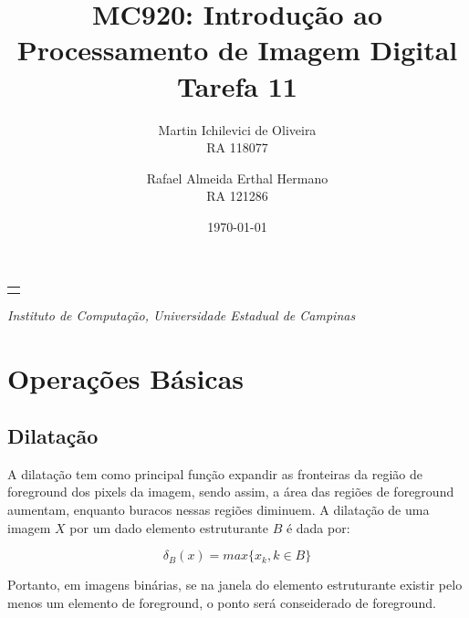 \documentclass[10pt,a4paper]{article}
\makeatletter
\let\@institution\empty
\def\institution#1{\def\@institution{#1}}
\renewcommand{\maketitle}{
    \begin{center}
        {\Large\bfseries\@title\par\medskip}
        {\large
            \begin{tabular}[t]{c}%
                \@author
        \end{tabular}\par\medskip}
        {\itshape\@institution\par}
        {\itshape\@date\par}
\end{center}}
\makeatother
\begin{document}

\title{MC920: Introdução ao Processamento de Imagem Digital\\Tarefa 11}
\author{
    \begin{minipage}{6cm}
        \centering
        Martin Ichilevici de Oliveira\\
        RA 118077
    \end{minipage}
    \and
    \begin{minipage}{6cm}
        \centering
        Rafael Almeida Erthal Hermano\\
        RA 121286
    \end{minipage}
}
\institution{Instituto de Computação, Universidade Estadual de Campinas}
\date{\today}

\maketitle

\section{Operações Básicas}

\subsection{Dilatação}
A dilatação tem como principal função expandir as fronteiras da região de foreground dos pixels da imagem, sendo assim, a área das regiões de foreground aumentam, enquanto buracos nessas regiões diminuem. A dilatação de uma imagem $X$ por um dado elemento estruturante $B$ é dada por:

\begin{equation}
    \delta_B(x) = max\{x_k, k \in B\}
\end{equation}

Portanto, em imagens binárias, se na janela do elemento estruturante existir pelo menos um elemento de foreground, o ponto será conseiderado de foreground.
\end{document}
